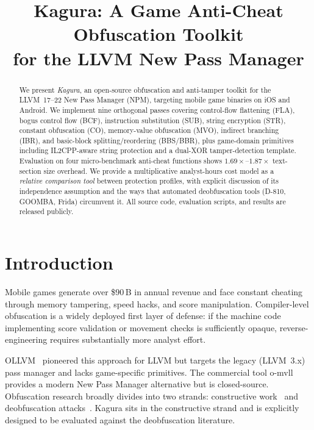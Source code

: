\documentclass[conference]{IEEEtran}
\begin{document}
\title{\Large\textbf{Kagura: A Game Anti-Cheat Obfuscation Toolkit\\
       for the LLVM New Pass Manager}}

\author{
}

\maketitle

\begin{abstract}
We present \textit{Kagura}, an open-source obfuscation and anti-tamper
toolkit for the LLVM~17--22 New Pass Manager (NPM), targeting mobile
game binaries on iOS and Android.
We implement nine orthogonal passes covering control-flow flattening
(FLA), bogus control flow (BCF), instruction substitution (SUB), string
encryption (STR), constant obfuscation (CO), memory-value obfuscation
(MVO), indirect branching (IBR), and basic-block splitting/reordering
(BBS/BBR), plus game-domain primitives including IL2CPP-aware string
protection and a dual-XOR tamper-detection template.
Evaluation on four micro-benchmark anti-cheat functions shows
$1.69\times$--$1.87\times$ text-section size overhead.
We provide a multiplicative analyst-hours cost model as a
\emph{relative comparison tool} between protection profiles, with
explicit discussion of its independence assumption and the ways that
automated deobfuscation tools (D-810, GOOMBA, Frida) circumvent it.
All source code, evaluation scripts, and results are released publicly.
\end{abstract}

\section{Introduction}
\label{sec:intro}

Mobile games generate over \$90\,B in annual revenue and face constant
cheating through memory tampering, speed hacks, and score manipulation.
Compiler-level obfuscation is a widely deployed first layer of defense:
if the machine code implementing score validation or movement checks is
sufficiently opaque, reverse-engineering requires substantially more
analyst effort.

OLLVM~\cite{junod2015obfuscator} pioneered this approach for LLVM but
targets the legacy (LLVM~3.x) pass manager and lacks game-specific
primitives.
The commercial tool o-mvll~\cite{quarkslab2022omvll} provides a modern
New Pass Manager alternative but is closed-source.
Obfuscation research broadly divides into two strands: constructive
work~\cite{collberg1997taxonomy,laszlo2009obfuscating} and deobfuscation
attacks~\cite{yadegari2015generic,blazytko2017syntia,eyrolles2017mixedbool}.
Kagura sits in the constructive strand and is explicitly designed to
be evaluated against the deobfuscation literature.
\end{document}
